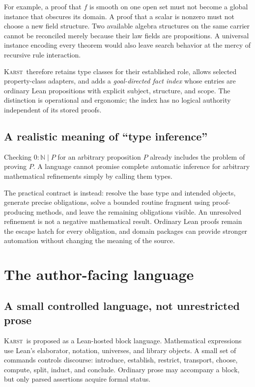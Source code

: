\documentclass[11pt,letterpaper]{article}
\newcommand{\Karst}{\textsc{Karst}}
\newcommand{\N}{\mathbb N}
\theoremstyle{remark}
\begin{document}
For example, a proof that $f$ is smooth on one open set must not become a
global instance that obscures its domain. A proof that a scalar is nonzero
must not choose a new field structure. Two available algebra structures on the
same carrier cannot be reconciled merely because their law fields are
propositions. A universal instance encoding every theorem would also leave
search behavior at the mercy of recursive rule interaction.

\Karst\ therefore retains type classes for their established role, allows
selected property-class adapters, and adds a \emph{goal-directed fact index}
whose entries are ordinary Lean propositions with explicit subject, structure,
and scope. The distinction is operational and ergonomic; the index has no
logical authority independent of its stored proofs.

\subsection{A realistic meaning of ``type inference''}
Checking $0:\N\mid P$ for an arbitrary proposition $P$ already includes the
problem of proving $P$. A language cannot promise complete automatic inference
for arbitrary mathematical refinements simply by calling them types.

The practical contract is instead: resolve the base type and intended objects,
generate precise obligations, solve a bounded routine fragment using
proof-producing methods, and leave the remaining obligations visible. An
unresolved refinement is not a negative mathematical result. Ordinary Lean
proofs remain the escape hatch for every obligation, and domain packages can
provide stronger automation without changing the meaning of the source.

\section{The author-facing language}\label{sec:surface}

\subsection{A small controlled language, not unrestricted prose}
\Karst\ is proposed as a Lean-hosted block language. Mathematical expressions
use Lean's elaborator, notation, universes, and library objects. A small set of
commands controls discourse: introduce, establish, restrict, transport, choose,
compute, split, induct, and conclude. Ordinary prose may accompany a block,
but only parsed assertions acquire formal status.
\end{document}
